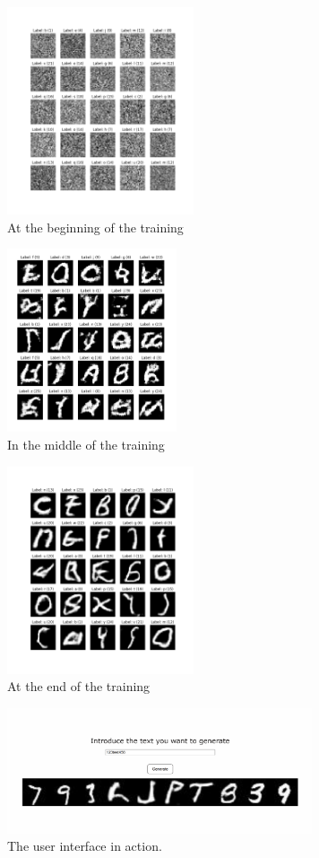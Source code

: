\documentclass[lettersize,journal]{IEEEtran}
\begin{document}
\begin{figure}[h]
    \centering
    \includegraphics[width=5.5cm]{noise.png}
    \caption{At the beginning of the training}
\end{figure}
\begin{figure}[h]
    \centering
    \includegraphics[width=5cm]{learning.png}
    \caption{In the middle of the training}
\end{figure}
\begin{figure}[h]
    \centering
    \includegraphics[width=5.5cm]{correct.png}
    \caption{At the end of the training}
\end{figure}

\newpage

\begin{figure}[h]
    \centering
    \includegraphics[width=9cm]{app.png}
    \caption{The user interface in action.}
\end{figure}
\end{document}
